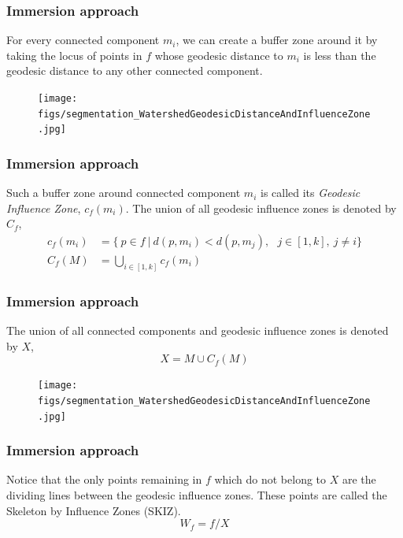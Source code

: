 \begin{frame}
\frametitle{Immersion approach}
\logoCSIPCPL\mypagenum
	For every connected component $m_i$, we can create a buffer zone around it by taking the locus of points in $f$ whose geodesic distance to $m_i$ is less than the geodesic distance to any other connected component.	
	\begin{figure}[!htp]
		\texttt{[image: figs/segmentation\_WatershedGeodesicDistanceAndInfluenceZone.jpg]}
	\end{figure}
\end{frame}






\begin{frame}
\frametitle{Immersion approach}
\logoCSIPCPL\mypagenum
	Such a buffer zone around connected component $m_i$ is called its \emph{Geodesic Influence Zone}, $c_f(m_i)$.  The union of all geodesic influence zones is denoted by $C_f$,
	\begin{align*}
		c_f(m_i)&=  \{ \ p \in f \ | \ d(p,m_i) < d(p,m_j), \ \ \ j \in [1,k], \ j \neq i \}\\
		C_f(M)&=\bigcup_{i \in [1,k]} c_f(m_i)
	\end{align*}
\end{frame}






\begin{frame}
\frametitle{Immersion approach}
\logoCSIPCPL\mypagenum
	The union of all connected components and geodesic influence zones is denoted by $X$,
	\begin{equation}
		X= M \cup C_f(M)
	\end{equation}
	\begin{figure}[!htp]	
		\texttt{[image: figs/segmentation\_WatershedGeodesicDistanceAndInfluenceZone.jpg]}
	\end{figure}
\end{frame}





\begin{frame}
\frametitle{Immersion approach}
\logoCSIPCPL\mypagenum	
	Notice that the only points remaining in $f$ which do not belong to $X$ are the dividing lines between the geodesic influence zones.  These points are called the Skeleton by Influence Zones (SKIZ).
	\begin{equation}
	W_f = f/X
	\end{equation}
\end{frame}







